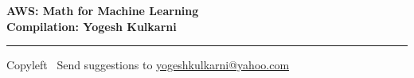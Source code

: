 
\graphicspath{{images/}}
% 
% 
% 
% 

% 
%


\footnotesize


\begin{center}
\Large{\textbf{AWS: Math for Machine Learning\\ Compilation: Yogesh Kulkarni}}  
\end{center}

\begin{multicols}{2}

\end{multicols}

\rule{\linewidth}{0.25pt}
\scriptsize
Copyleft \textcopyleft\  Send suggestions to 
\href{http://www.yogeshkulkarni.com}{yogeshkulkarni@yahoo.com}


